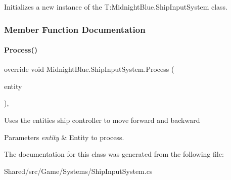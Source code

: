 Initializes a new instance of the T\+:\+Midnight\+Blue.\+Ship\+Input\+System class. 



\subsubsection{Member Function Documentation}
\hypertarget{class_midnight_blue_1_1_ship_input_system_ac504beb5b6afa47ca4618d9683e46946}{}\label{class_midnight_blue_1_1_ship_input_system_ac504beb5b6afa47ca4618d9683e46946} 
\paragraph{\texorpdfstring{Process()}{Process()}}
{\footnotesize\ttfamily override void Midnight\+Blue.\+Ship\+Input\+System.\+Process (\begin{DoxyParamCaption}\item[{Entity}]{entity }\end{DoxyParamCaption})\hspace{0.3cm}{\ttfamily [inline]}, {\ttfamily [protected]}}



Uses the entities ship controller to move forward and backward 


\begin{DoxyParams}{Parameters}
{\em entity} & Entity to process.\\
\hline
\end{DoxyParams}


The documentation for this class was generated from the following file\+:\begin{DoxyCompactItemize}
\item 
Shared/src/\+Game/\+Systems/Ship\+Input\+System.\+cs\end{DoxyCompactItemize}

